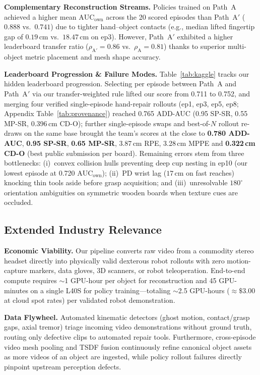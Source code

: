 \documentclass[10pt]{nvidiaextabstract}
\newcommand{\ownauc}{\ensuremath{\mathrm{AUC}_{\text{own}}}\xspace}
\begin{document}
\textbf{Complementary Reconstruction Streams.} Policies trained on Path~A achieved a higher mean $\ownauc$ across the 20 scored episodes than Path~A$'$ ($0.888$ vs.\ $0.741$) due to tighter hand--object contacts (e.g., median lifted fingertip gap of $0.19$\,cm vs.\ $18.47$\,cm on ep3). However, Path~A$'$ exhibited a higher leaderboard transfer ratio ($\rho_{\text{A}'}=0.86$ vs.\ $\rho_{\text{A}}=0.81$) thanks to superior multi-object metric placement and mesh shape accuracy.

\textbf{Leaderboard Progression \& Failure Modes.} Table~\ref{tab:kaggle} tracks our hidden leaderboard progression. Selecting per episode between Path~A and Path~A$'$ via our transfer-weighted rule lifted our score from 0.711 to 0.752, and merging four verified single-episode hand-repair rollouts (ep1, ep3, ep5, ep8; Appendix Table~\ref{tab:provenance}) reached 0.765 ADD-AUC (0.95 SP-SR, 0.55 MP-SR, 0.396\,cm CD-O); further single-episode swaps and best-of-$N$ rollout re-draws on the same base brought the team's scores at the close to \textbf{0.780 ADD-AUC}, \textbf{0.95 SP-SR}, \textbf{0.65 MP-SR}, 3.87\,cm RPE, 3.28\,cm MPPE and \textbf{0.322\,cm CD-O} (best public submission per board). Remaining errors stem from three bottlenecks: (i)~convex collision hulls preventing deep cup nesting in ep10 (our lowest episode at 0.720 \ownauc); (ii)~PD wrist lag ($17$\,cm on fast reaches) knocking thin tools aside before grasp acquisition; and (iii)~unresolvable $180^\circ$ orientation ambiguities on symmetric wooden boards when texture cues are occluded.

\subsection{Extended Industry Relevance}
\label{app:detail-industry}
\textbf{Economic Viability.} Our pipeline converts raw video from a commodity stereo headset directly into physically valid dexterous robot rollouts with zero motion-capture markers, data gloves, 3D scanners, or robot teleoperation. End-to-end compute requires $\sim$1 GPU-hour per object for reconstruction and 45 GPU-minutes on a single L40S for policy training—totaling $\sim$2.5 GPU-hours ($\approx\$3.00$ at cloud spot rates) per validated robot demonstration.

\textbf{Data Flywheel.} Automated kinematic detectors (ghost motion, contact/grasp gaps, axial tremor) triage incoming video demonstrations without ground truth, routing only defective clips to automated repair tools. Furthermore, cross-episode video mesh pooling and TSDF fusion continuously refine canonical object assets as more videos of an object are ingested, while policy rollout failures directly pinpoint upstream perception defects.
\end{document}
